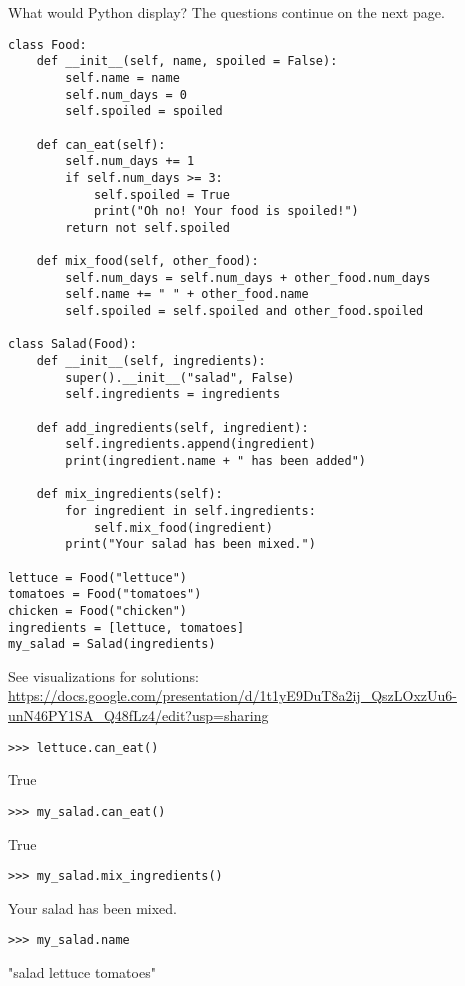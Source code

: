 \question 
What would Python display? The questions continue on the next page.

\begin{lstlisting}
class Food:
    def __init__(self, name, spoiled = False):
        self.name = name
        self.num_days = 0
        self.spoiled = spoiled

    def can_eat(self):
        self.num_days += 1
        if self.num_days >= 3:
            self.spoiled = True
            print("Oh no! Your food is spoiled!")
        return not self.spoiled

    def mix_food(self, other_food):
        self.num_days = self.num_days + other_food.num_days
        self.name += " " + other_food.name
        self.spoiled = self.spoiled and other_food.spoiled

class Salad(Food):
    def __init__(self, ingredients):
        super().__init__("salad", False)
        self.ingredients = ingredients
		
    def add_ingredients(self, ingredient):
        self.ingredients.append(ingredient)
        print(ingredient.name + " has been added")

    def mix_ingredients(self):
        for ingredient in self.ingredients:
            self.mix_food(ingredient)
        print("Your salad has been mixed.")

lettuce = Food("lettuce")
tomatoes = Food("tomatoes")
chicken = Food("chicken")
ingredients = [lettuce, tomatoes]
my_salad = Salad(ingredients)
\end{lstlisting}

\vspace{9\baselineskip}
\begin{solution}
See visualizations for solutions: \url{https://docs.google.com/presentation/d/1t1yE9DuT8a2ij_QszLOxzUu6-unN46PY1SA_Q48fLz4/edit?usp=sharing}
\end{solution}

\begin{lstlisting}
>>> lettuce.can_eat()
\end{lstlisting}
\begin{solution}[.2in]
True
\end{solution}

\begin{lstlisting}
>>> my_salad.can_eat()
\end{lstlisting}
\begin{solution}[.2in]
True
\end{solution}

\begin{lstlisting}
>>> my_salad.mix_ingredients()
\end{lstlisting}
\begin{solution}[.2in]
Your salad has been mixed.
\end{solution}

\begin{lstlisting}
>>> my_salad.name
\end{lstlisting}
\begin{solution}[.3in]
"salad lettuce tomatoes"
\end{solution}
